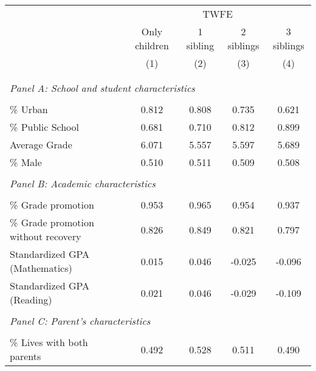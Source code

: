 \makeatletter
{}
{
\makeatother
\begin{tabular}{lcccc}
\toprule
\cmidrule(lr){2-4}
& \multicolumn{4}{c}{TWFE}  \\
\cmidrule(lr){2-4}
& Only children & 1 sibling & 2 siblings & 3 siblings  \\
\cmidrule(lr){2-2} \cmidrule(lr){3-3} \cmidrule(lr){4-4} \cmidrule(lr){5-5}
& (1) & (2) & (3) & (4)\\
\bottomrule
&  &  &  & \\
&  &  &   \\
\multicolumn{4}{l}{\textit{Panel A: School and student characteristics}} \\
            &            &            &            &            \\
\% Urban    &       0.812&       0.808&       0.735&       0.621\\
\% Public School&       0.681&       0.710&       0.812&       0.899\\
Average Grade&       6.071&       5.557&       5.597&       5.689\\
\% Male     &       0.510&       0.511&       0.509&       0.508\\
&  &  &   \\
\multicolumn{4}{l}{\textit{Panel B: Academic characteristics}} \\
            &            &            &            &            \\
\% Grade promotion&       0.953&       0.965&       0.954&       0.937\\
\% Grade promotion without recovery&       0.826&       0.849&       0.821&       0.797\\
Standardized GPA (Mathematics) &       0.015&       0.046&      -0.025&      -0.096\\
Standardized GPA (Reading)&       0.021&       0.046&      -0.029&      -0.109\\
&  &  &   \\
\multicolumn{4}{l}{\textit{Panel C: Parent's characteristics}} \\
            &            &            &            &            \\
\% Lives with both parents&       0.492&       0.528&       0.511&       0.490\\

\end{tabular}}
